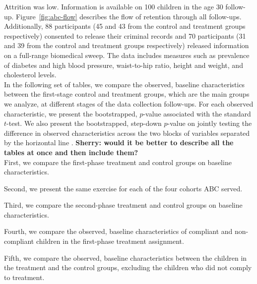 \begin{appendices}
\noindent Attrition was low. Information is available on 100 children in the age 30 follow-up. Figure~\ref{fig:abc-flow} describes the flow of retention through all follow-ups. Additionally, 88 participants (45 and 43 from the control and treatment groups respectively) consented to release their criminal records and 70 participants (31 and 39 from the control and treatment groups respectively) released information on a full-range biomedical sweep. The data includes measures such as prevalence of diabetes and high blood pressure, waist-to-hip ratio, height and weight, and cholesterol levels.\\ 

\noindent In the following set of tables, we compare the observed, baseline characteristics between the first-stage control and treatment groups, which are the main groups we analyze, at different stages of the data collection follow-ups. For each observed characteristic, we present the bootstrapped, $p$-value associated with the standard $t$-test. We also present the bootstrapped, step-down $p$-value on jointly testing the difference in observed characteristics across the two blocks of variables separated by the horizontal line \citep{Lehmann_Romano_2005_testing}. \textbf{Sherry: would  it be better to describe all the tables at once and then include them?}\\

\noindent First, we compare the first-phase treatment and control groups on baseline characteristics. 



\noindent Second, we present the same exercise for each of the four cohorts ABC served.









\noindent Third, we compare the second-phase treatment and control groups on baseline characteristics. 



\noindent Fourth, we compare the observed, baseline characteristics of compliant and non-compliant children in the first-phase treatment assignment.



\noindent Fifth, we compare the observed, baseline characteristics between the children in the treatment and the control groups, excluding the children who did not comply to treatment.


\end{appendices}
